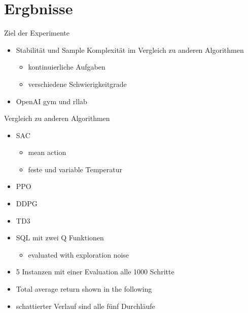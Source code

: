 \section*{Ergbnisse}




\begin{frame}{Ziel der Experimente}
        \begin{itemize}
            \item Stabilität und Sample Komplexität im Vergleich zu anderen Algorithmen
            \begin{itemize}
                \item kontinuierliche Aufgaben
                \item verschiedene Schwierigkeitgrade
            \end{itemize}  
            \item OpenAI gym und rllab
        \end{itemize}
\end{frame}

\begin{frame}{Vergleich zu anderen Algorithmen}
    \begin{itemize}
        \item SAC
        \begin{itemize}
            \item mean action
            \item feste und variable Temperatur
        \end{itemize} 
        \item PPO
        \item DDPG
        \item TD3
        \item SQL mit zwei Q Funktionen
        \begin{itemize}
            \item evaluated with exploration noise
        
        \end{itemize}
        \item 5 Instanzen mit einer Evaluation alle 1000 Schritte
        \item Total average return shown in the following
        \item schattierter Verlauf sind alle fünf Durchläufe
        
    \end{itemize}
        
\end{frame}

